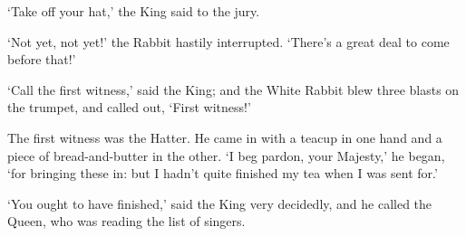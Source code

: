 \documentclass[statementpaper,twoside,openany]{memoir}
\begin{document}
`Take off your hat,' the King said to the jury.

`Not yet, not yet!' the Rabbit hastily interrupted. `There's a great deal to come before that!'

`Call the first witness,' said the King; and the White Rabbit blew three blasts on the trumpet, and called out, `First witness!'

The first witness was the Hatter. He came in with a teacup in one hand and a piece of bread-and-butter in the other. `I beg pardon, your Majesty,' he began, `for bringing these in: but I hadn't quite finished my tea when I was sent for.'

`You ought to have finished,' said the King very decidedly, and he called the Queen, who was reading the list of singers.
\end{document}
